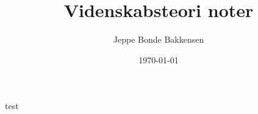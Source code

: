 \documentclass[12pt]{article}
\title{Videnskabsteori noter}
\author{Jeppe Bonde Bakkensen}
\date{\today}
\begin{document}
\maketitle

test
\end{document}
